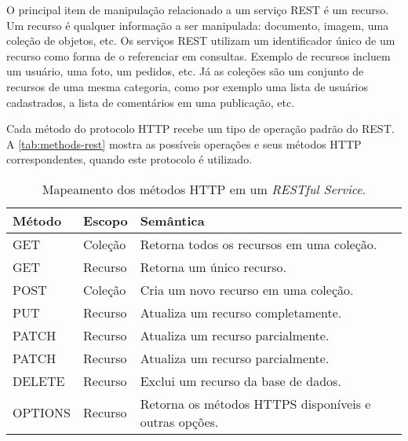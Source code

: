 O principal item de manipulação relacionado a um serviço REST é um recurso. Um recurso é qualquer informação a ser manipulada: documento, imagem, uma coleção de objetos, etc. Os serviços REST utilizam um identificador único de um recurso como forma de o referenciar em consultas. Exemplo de recursos incluem um usuário, uma foto, um pedidos, etc. Já as coleções são um conjunto de recursos de uma mesma categoria, como por exemplo uma  lista de usuários cadastrados, a lista de comentários em uma publicação, etc.

Cada método do protocolo HTTP recebe um tipo de operação padrão do REST. A \autoref{tab:methods-rest} mostra as possíveis operações e seus métodos HTTP correspondentes, quando este protocolo é utilizado.

\begin{table}[htb]
	\centering
	\begin{tabular}{p{2cm}p{2cm}p{9cm}}
		\hline
		\textbf{Método} &
		\textbf{Escopo} &
		\textbf{Semântica}                                    \\[5mm]

		\hline
		GET             &
		Coleção         &
		Retorna todos os recursos em uma coleção.             \\[5mm]

		\hline
		GET             &
		Recurso         &
		Retorna um único recurso.                             \\[5mm]

		\hline
		POST            &
		Coleção         &
		Cria um novo recurso em uma coleção.                  \\[5mm]

		\hline
		PUT             &
		Recurso         &
		Atualiza um recurso completamente.                    \\[5mm]

		\hline
		PATCH           &
		Recurso         &
		Atualiza um recurso parcialmente.                     \\[5mm]

		\hline
		PATCH           &
		Recurso         &
		Atualiza um recurso parcialmente.                     \\[5mm]

		\hline
		DELETE          &
		Recurso         &
		Exclui um recurso da base de dados.                   \\[5mm]

		\hline
		OPTIONS         &
		Recurso         &
		Retorna os métodos HTTPS disponíveis e outras opções. \\[5mm]

		\hline
	\end{tabular}
	\caption{Mapeamento dos métodos HTTP em um \textit{RESTful Service}.}
	\label{tab:methods-rest}
\end{table}

